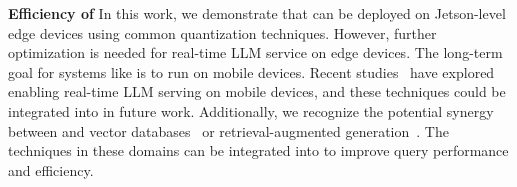 \textbf{Efficiency of \Method} In this work, we demonstrate that \Method can be deployed on Jetson-level edge devices using common quantization techniques. However, further optimization is needed for real-time LLM service on edge devices. The long-term goal for systems like \Method is to run on mobile devices. Recent studies~\cite{liu2024mobilellm, zhuang2024litemoe} have explored enabling real-time LLM serving on mobile devices, and these techniques could be integrated into \Method in future work. Additionally, we recognize the potential synergy between \Method and vector databases~\cite{zhou2024llm} or retrieval-augmented generation~\cite{zhao2024retrieval}. The techniques in these domains can be integrated into \Method to improve query performance and efficiency.

